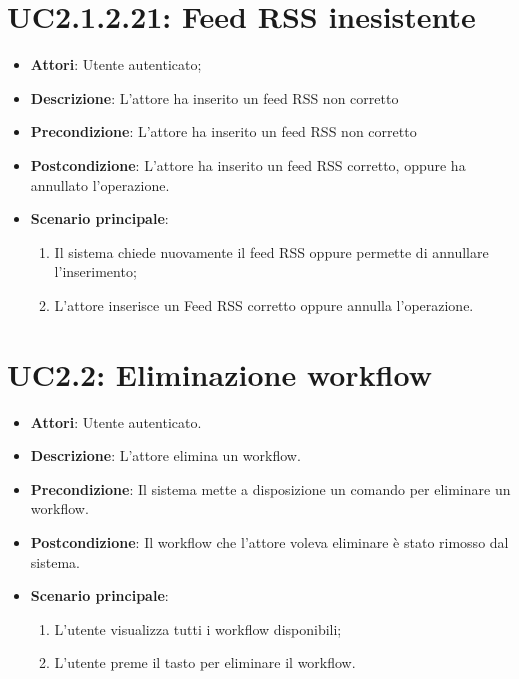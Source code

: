 \section{UC2.1.2.21: Feed RSS inesistente}
\label{UC2.1.2.21}
\begin{itemize}
	\item \textbf{Attori}: Utente autenticato;
	\item \textbf{Descrizione}: L'attore ha inserito un feed RSS non corretto
	\item \textbf{Precondizione}: L'attore ha inserito un feed RSS non corretto
	\item \textbf{Postcondizione}: L'attore ha inserito un feed RSS corretto, oppure ha annullato l'operazione.
	\item \textbf{Scenario principale}:
	\begin{enumerate} \item Il sistema chiede nuovamente il feed RSS oppure permette di annullare l'inserimento;  \item  L'attore inserisce un Feed RSS corretto oppure annulla l'operazione.\end{enumerate}
\end{itemize}

\section{UC2.2: Eliminazione workflow}
\label{UC2.2}
\begin{itemize}
	\item \textbf{Attori}: Utente autenticato.
	\item \textbf{Descrizione}: L'attore elimina un workflow.
	\item \textbf{Precondizione}: Il sistema mette a disposizione un comando per eliminare un workflow.
	\item \textbf{Postcondizione}: Il workflow che l'attore voleva eliminare è stato rimosso dal sistema.
	\item \textbf{Scenario principale}:
	\begin{enumerate} \item L'utente visualizza tutti i workflow disponibili; \item L'utente preme il tasto per eliminare il workflow.\end{enumerate}
\end{itemize}

